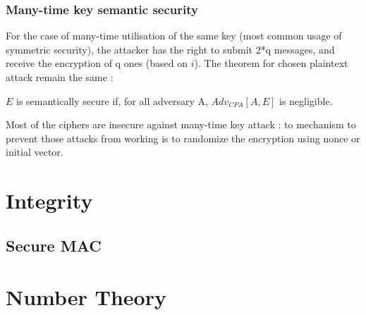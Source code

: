 \subsubsection{Many-time key semantic security}

For the case of many-time utilisation of the same key (most common usage of symmetric security), the attacker has the right to submit 2*q messages, and receive the encryption of q ones (based on $i$). The theorem for chosen plaintext attack remain the same :

\begin{mytheorem}
    $E$ is semantically secure if, for all adversary A, $Adv_{CPA}[A,E]$ is negligible.
\end{mytheorem}

Most of the ciphers are insecure against many-time key attack : to mechanism to prevent those attacks from working is to randomize the encryption using nonce or initial vector.

\section{Integrity}
\subsection{Secure MAC}


\section{Number Theory}
